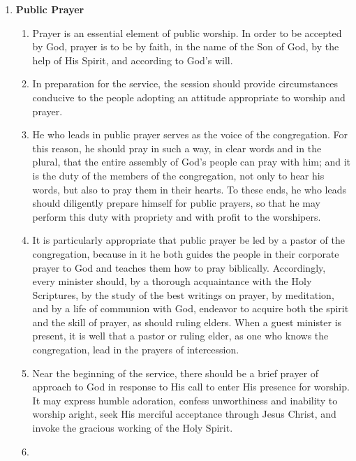 \documentclass[
]{book}
\providecommand{\tightlist}{%
  \setlength{\itemsep}{0pt}\setlength{\parskip}{0pt}}
\begin{document}
\begin{enumerate}
\def\labelenumi{\arabic{enumi}.}
\tightlist
\item
  \protect\hypertarget{55}{\href{}{}}\textbf{Public Prayer}

  \begin{enumerate}
  \def\labelenumii{\alph{enumii}.}
  \tightlist
  \item
    Prayer is an essential element of public worship. In order to be accepted by God, prayer is to be by faith, in the name of the Son of God, by the help of His Spirit, and according to God's will.
  \item
    In preparation for the service, the session should provide circumstances conducive to the people adopting an attitude appropriate to worship and prayer.
  \item
    He who leads in public prayer serves as the voice of the congregation. For this reason, he should pray in such a way, in clear words and in the plural, that the entire assembly of God's people can pray with him; and it is the duty of the members of the congregation, not only to hear his words, but also to pray them in their hearts. To these ends, he who leads should diligently prepare himself for public prayers, so that he may perform this duty with propriety and with profit to the worshipers.
  \item
    It is particularly appropriate that public prayer be led by a pastor of the congregation, because in it he both guides the people in their corporate prayer to God and teaches them how to pray biblically. Accordingly, every minister should, by a thorough acquaintance with the Holy Scriptures, by the study of the best writings on prayer, by meditation, and by a life of communion with God, endeavor to acquire both the spirit and the skill of prayer, as should ruling elders. When a guest minister is present, it is well that a pastor or ruling elder, as one who knows the congregation, lead in the prayers of intercession.
  \item
    Near the beginning of the service, there should be a brief prayer of approach to God in response to His call to enter His presence for worship. It may express humble adoration, confess unworthiness and inability to worship aright, seek His merciful acceptance through Jesus Christ, and invoke the gracious working of the Holy Spirit.
  \item

\end{enumerate}
\end{enumerate}
\end{document}
